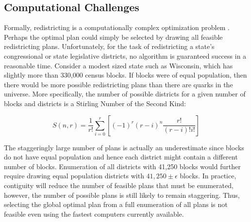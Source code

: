 \documentclass[article]{JSSstyle/jss}
\begin{document}
\subsection{Computational  Challenges} 

Formally, redistricting is a computationally complex optimization 
problem \citep[][]{Altman97}.  Perhaps the optimal plan could simply 
be selected by drawing all feasible redistricting plans.  
Unfortunately, for the task of redistricting a state's congressional 
or state legislative districts, no algorithm is guaranteed success 
in a reasonable time.  Consider a modest sized state such as 
Wisconsin, which has slightly more than 330,000 census blocks.  If 
blocks were of equal population, then there would be more possible redistricting plans than there are quarks in the universe.  
More specifically, the number of
possible districts for a given number of blocks and districts is a Stirling Number of the Second Kind:

\[
S\left( {n,r} \right) = \frac{1}{{r!}}\sum\limits_{i = 0}^r {\left[ {\left( { - 1} \right)^r \left( {r - i} \right)^n \frac{{r!}}{{\left( {r - i} \right)!i!}}} \right]} 
\]


The staggeringly 
large number of plans is actually an underestimate since blocks do not have equal 
population and hence each district might contain a different number of blocks.  Enumeration of all districts with 41,250 blocks would 
further require drawing equal population districts with 
$41,250\pm\epsilon$ blocks.  In practice, contiguity will reduce the number of feasible plans that must be enumerated, 
however, the number of possible plans is still likely to remain staggering.  Thus, selecting the global optimal plan 
from a full enumeration of all plans is not feasible even using the 
fastest computers currently available.
\end{document}
